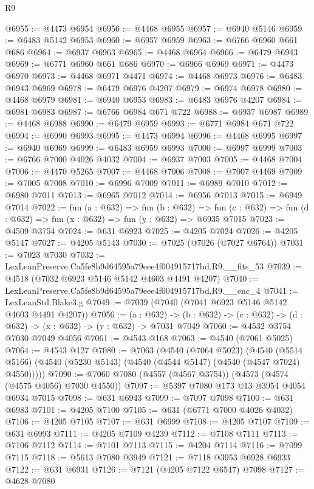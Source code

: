 \begin{lexlean}{R9}
\begin{coremodule}
@6955 := @4473 @6954
@6956 := @4468 @6955
@6957 := @6940 @5146
@6959 := @6483 @5142 @6953
@6960 := @6957 @6959
@6963 := @6766 @6960 @661 @686
@6964 := @6937 @6963
@6965 := @4468 @6964
@6966 := @6479 @6943
@6969 := @6771 @6960 @661 @686
@6970 := @6966 @6969
@6971 := @4473 @6970
@6973 := @4468 @6971 @4471
@6974 := @4468 @6973
@6976 := @6483 @6943 @6969
@6978 := @6479 @6976 @4207
@6979 := @6974 @6978
@6980 := @4468 @6979
@6981 := @6940 @6953
@6983 := @6483 @6976 @4207
@6984 := @6981 @6983
@6987 := @6766 @6984 @671 @722
@6988 := @6937 @6987
@6989 := @4468 @6988
@6990 := @6479 @6959
@6993 := @6771 @6984 @671 @722
@6994 := @6990 @6993
@6995 := @4473 @6994
@6996 := @4468 @6995
@6997 := @6940 @6969
@6999 := @6483 @6959 @6993
@7000 := @6997 @6999
@7003 := @6766 @7000 @4026 @4032
@7004 := @6937 @7003
@7005 := @4468 @7004
@7006 := @4470 @5265
@7007 := @4468 @7006
@7008 := @7007 @4469
@7009 := @7005 @7008
@7010 := @6996 @7009
@7011 := @6989 @7010
@7012 := @6980 @7011
@7013 := @6965 @7012
@7014 := @6956 @7013
@7015 := @6949 @7014
@7022 := fun (a : @632) =>
  fun (b : @632) =>
  fun (c : @632) => fun (d : @632) => fun (x : @632) => fun (y : @632) => @6935 @7015
@7023 := @4509 @3754
@7024 := @631 @6923
@7025 := @4205 @7024
@7026 := @4205 @5147
@7027 := @4205 @5143
@7030 := @7025 (@7026 (@7027 @6764))
@7031 := @7023 @7030
@7032 := LexLeanPreserve.Ca5fe8b9d64595a79eee4f004915717bd.R9.__fits_53
@7039 := @4518 (@7032 @6923 @5146 @5142 @4603 @4491 @4207)
@7040 := LexLeanPreserve.Ca5fe8b9d64595a79eee4f004915717bd.R9.__enc_4
@7041 := LexLeanStd.Blake3.g
@7049 := @7039 (@7040 (@7041 @6923 @5146 @5142 @4603 @4491 @4207))
@7056 := (a : @632) ->
  (b : @632) -> (c : @632) -> (d : @632) -> (x : @632) -> (y : @632) -> @7031 @7049
@7060 := @4532 @3754 @7030 @7049 @4056
@7061 := @4543 @168
@7063 := @4540 (@7061 @5025)
@7064 := @4543 @127
@7080 := @7063
    (@4540
      (@7064 @5023)
      (@4540 (@5514 @5166) (@4540 (@5230 @5143) (@4540 (@4544 @5147) (@4540 (@4547 @7024) @4550)))))
@7090 := @7060 @7080 (@4557 (@4567 @3754)) (@4573 (@4574 (@4575 @4056) @7030 @4550))
@7097 := @5397 @7080 @173 @13 @3954 @4054 @6934 @7015
@7098 := @631 @6943
@7099 := @7097 @7098
@7100 := @631 @6983
@7101 := @4205 @7100
@7105 := @631 (@6771 @7000 @4026 @4032)
@7106 := @4205 @7105
@7107 := @631 @6999
@7108 := @4205 @7107
@7109 := @631 @6993
@7111 := @4205 @7109 @4239
@7112 := @7108 @7111
@7113 := @7106 @7112
@7114 := @7101 @7113
@7115 := @4204 @7114
@7116 := @7099 @7115
@7118 := @5613 @7080 @3949
@7121 := @7118 @3953 @6928 @6933
@7122 := @631 @6931
@7126 := @7121 (@4205 @7122 @6547) @7098
@7127 := @4628 @7080

\end{coremodule}
\end{lexlean}
